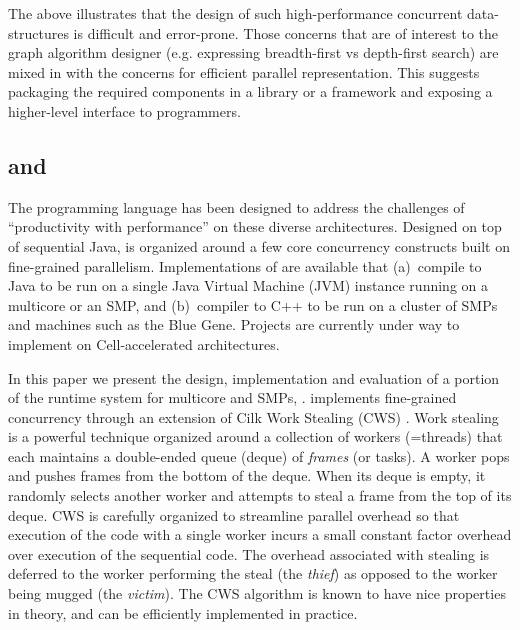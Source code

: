 The above illustrates that the design of such high-performance
concurrent data-structures is difficult and error-prone. Those
concerns that are of interest to the graph algorithm designer (e.g.{}
expressing breadth-first vs depth-first search) are mixed in with the
concerns for efficient parallel representation.  This suggests
packaging the required components in a library or a framework and
exposing a higher-level interface to programmers.

\subsection{\Xten{} and \XWS}
The \Xten{} programming language \cite{concur05,CGSDKEPS05,x10} has been
designed to address the challenges of ``productivity with
performance'' on these diverse architectures. Designed on top of
sequential Java, \Xten{} is organized around a few core concurrency
constructs built on fine-grained parallelism. Implementations of
\Xten{} are available that (a)~compile \Xten{} to Java to be run on a
single Java Virtual Machine (JVM) instance running on a multicore or
an SMP, and (b)~compiler \Xten{} to C++ to be run on a cluster of SMPs
and machines such as the Blue Gene. Projects are currently under way
to implement \Xten{} on Cell-accelerated architectures.

In this paper we present the design, implementation and evaluation of
a portion of the \Xten{} runtime system for multicore and SMPs,
\XWS{}. \XWS{} implements fine-grained concurrency through an
extension of Cilk Work Stealing (CWS) \cite{BJKLRZ95}.  Work stealing is a
powerful technique organized around a collection of workers (=threads)
that each maintains a double-ended queue (deque) of {\em frames} (or
tasks). A worker pops and pushes frames from the bottom of the
deque. When its deque is empty, it randomly selects another worker and
attempts to steal a frame from the top of its deque. CWS is carefully
organized to streamline parallel overhead so that execution of the
code with a single worker incurs a small constant factor overhead over
execution of the sequential code. The overhead associated with
stealing is deferred to the worker performing the steal (the {\em
thief}) as opposed to the worker being mugged (the {\em victim}). The
CWS algorithm is known to have nice properties in theory, and can be
efficiently implemented in practice.

